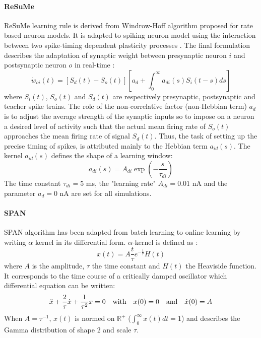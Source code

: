 \documentclass[11pt, a4paper]{article} %
\begin{document}
\paragraph{ReSuMe}
ReSuMe learning rule is derived from Windrow-Hoff algorithm proposed for rate based neuron models. It is adapted to spiking neuron model using the interaction between two spike-timing dependent plasticity processes \cite{ponulak2010supervised}. The final formulation describes the adaptation of synaptic weight between presynaptic neuron $i$ and postsynaptic neuron $o$ in real-time : \begin{equation}
\dot{w}_{oi}(t) = \left[ S_d(t) - S_o(t) \right] \left[ a_d + \int_0^\infty a_{di}(s) S_i(t-s) ds \right]
\end{equation}
where $S_i(t)$, $S_o(t)$ and $S_d(t)$ are respectively presynaptic, postsynaptic and teacher spike trains. The role of the non-correlative factor (non-Hebbian term) $a_d$ is to adjust the average strength of the synaptic inputs so to impose on a neuron a desired level of activity such that the actual mean firing rate of $S_o(t)$ approaches the mean firing rate of signal $S_d(t)$. Thus, the task of setting up the precise timing of spikes, is attributed mainly to the Hebbian term $a_{id}(s)$. The kernel $a_{id}(s)$ defines the shape of a learning window: \begin{equation}
a_{di}(s) = A_{di} \exp (-\frac{s}{\tau_{di}})
\end{equation}
The time constant $\tau_{di} = 5$ ms, the "learning rate" $A_{di} = 0.01$ nA and the parameter $a_d = 0$ nA are set for all simulations.

\paragraph{SPAN}
SPAN algorithm has been adapted from batch learning \cite{mohemmed2012span, mohemmed2013training} to online learning by writing $\alpha$ kernel in its differential form. $\alpha$-kernel is defined as : \begin{equation}
x(t) = A \frac{t}{\tau} e^{-\frac{t}{\tau}} H(t)
\end{equation}
where $A$ is the amplitude, $\tau$ the time constant and $H(t)$ the Heaviside function.
It corresponds to the time course of a critically damped oscillator which differential equation can be written: \begin{equation}
\ddot{x} + \frac{2}{\tau} \dot{x} + \frac{1}{\tau^2} x = 0 \quad \textnormal{with} \quad x(0) = 0 \quad \textnormal{and} \quad \dot{x}(0) = A
\label{SPAN}
\end{equation}
When $A = \tau^{-1}$, $x(t)$ is normed on $\mathbb{R}^+$ ($\int_0^\infty x(t)dt = 1$) and describes the Gamma distribution of shape 2 and scale $\tau$.
\end{document}
